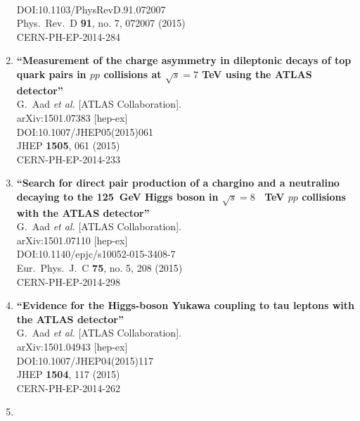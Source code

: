 \documentclass{article}
\begin{document}
\begin{enumerate}
  \\{}DOI:10.1103/PhysRevD.91.072007
  \\{}Phys.\ Rev.\ D {\bf 91}, no. 7, 072007 (2015)
  \\{}CERN-PH-EP-2014-284
\item%
{\bf ``Measurement of the charge asymmetry in dileptonic decays of top quark pairs in $pp$ collisions at $\sqrt{s}=7$ TeV using the ATLAS detector''}
  \\{}G.~Aad {\it et al.} [ATLAS Collaboration].
  \\{}arXiv:1501.07383 [hep-ex]
  \\{}DOI:10.1007/JHEP05(2015)061
  \\{}JHEP {\bf 1505}, 061 (2015)
  \\{}CERN-PH-EP-2014-233
\item%
{\bf ``Search for direct pair production of a chargino and a neutralino decaying to the 125 GeV Higgs boson in $\sqrt{s} = 8$  TeV ${pp}$ collisions with the ATLAS detector''}
  \\{}G.~Aad {\it et al.} [ATLAS Collaboration].
  \\{}arXiv:1501.07110 [hep-ex]
  \\{}DOI:10.1140/epjc/s10052-015-3408-7
  \\{}Eur.\ Phys.\ J.\ C {\bf 75}, no. 5, 208 (2015)
  \\{}CERN-PH-EP-2014-298
\item%
{\bf ``Evidence for the Higgs-boson Yukawa coupling to tau leptons with the ATLAS detector''}
  \\{}G.~Aad {\it et al.} [ATLAS Collaboration].
  \\{}arXiv:1501.04943 [hep-ex]
  \\{}DOI:10.1007/JHEP04(2015)117
  \\{}JHEP {\bf 1504}, 117 (2015)
  \\{}CERN-PH-EP-2014-262
\item%

\end{enumerate}
\end{document}
